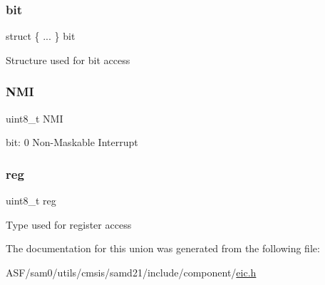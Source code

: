 \subsubsection{\texorpdfstring{bit}{bit}}
{\footnotesize\ttfamily struct \{ ... \}   bit}

Structure used for bit access \mbox{\label{union_e_i_c___n_m_i_f_l_a_g___type_af78a0228b4f42bec9dcb218a4b8342ac}} 
\subsubsection{\texorpdfstring{NMI}{NMI}}
{\footnotesize\ttfamily uint8\+\_\+t N\+MI}

bit\+: 0 Non-\/\+Maskable Interrupt \mbox{\label{union_e_i_c___n_m_i_f_l_a_g___type_a9428adc9af4653a2050e2536b55dec8d}} 
\subsubsection{\texorpdfstring{reg}{reg}}
{\footnotesize\ttfamily uint8\+\_\+t reg}

Type used for register access 

The documentation for this union was generated from the following file\+:\begin{DoxyCompactItemize}
\item 
A\+S\+F/sam0/utils/cmsis/samd21/include/component/\mbox{\hyperlink{component_2eic_8h}{eic.\+h}}\end{DoxyCompactItemize}
